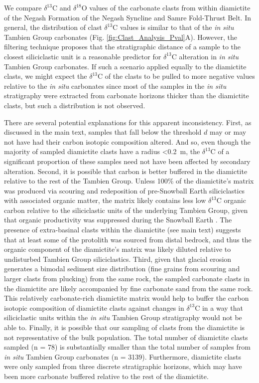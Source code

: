 \documentclass[11pt,letterpaper]{article}
\newcommand{\dC}{$\delta^{13}$C\xspace}
\newcommand{\dO}{$\delta^{18}$O\xspace}
\newcommand{\dsil}{$d$\xspace}
\begin{document}
We compare \dC and \dO values of the carbonate clasts from within diamictite of the Negash Formation of the Negash Syncline and Samre Fold-Thrust Belt. In general, the distribution of clast \dC values is similar to that of the \textit{in situ} Tambien Group carbonates (Fig. \ref{fig:Clast_Analysis_Pval}A). However, the filtering technique proposes that the stratigraphic distance of a sample to the closest siliciclastic unit is a reasonable predictor for \dC alteration in \textit{in situ} Tambien Group carbonates. If such a scenario applied equally to the diamictite clasts, we might expect the \dC of the clasts to be pulled to more negative values relative to the \textit{in situ} carbonates since most of the samples in the \textit{in situ} stratigraphy were extracted from carbonate horizons thicker than the diamictite clasts, but such a distribution is not observed.

There are several potential explanations for this apparent inconsistency. First, as discussed in the main text, samples that fall below the threshold \dsil may or may not have had their carbon isotopic composition altered. And so, even though the majority of sampled diamictite clasts have a radius \textless0.2~m, the \dC of a significant proportion of these samples need not have been affected by secondary alteration. Second, it is possible that carbon is better buffered in the diamictite relative to the rest of the Tambien Group. Unless 100\% of the diamictite's matrix was produced via scouring and redeposition of pre-Snowball Earth siliciclastics with associated organic matter, the matrix likely contains less low \dC organic carbon relative to the siliciclastic units of the underlying Tambien Group, given that organic productivity was suppressed during the Snowball Earth \citep{Hoffman2017a}. The presence of extra-basinal clasts within the diamictite (see main text) suggests that at least some of the protolith was sourced from distal bedrock, and thus the organic component of the diamictite's matrix was likely diluted relative to undisturbed Tambien Group siliciclastics. Third, given that glacial erosion generates a bimodal sediment size distribution (fine grains from scouring and larger clasts from plucking) from the same rock, the sampled carbonate clasts in the diamictite are likely accompanied by fine carbonate sand from the same rock. This relatively carbonate-rich diamictite matrix would help to buffer the carbon isotopic composition of diamictite clasts against changes in \dC in a way that siliciclastic units within the \textit{in situ} Tambien Group stratigraphy would not be able to. Finally, it is possible that our sampling of clasts from the diamictite is not representative of the bulk population. The total number of diamictite clasts sampled (n = 78) is substantially smaller than the total number of samples from \textit{in situ} Tambien Group carbonates (n = 3139). Furthermore, diamictite clasts were only sampled from three discrete stratigraphic horizons, which may have been more carbonate buffered relative to the rest of the diamictite.
\end{document}

